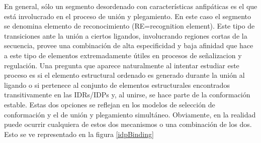 En general, sólo un segmento desordenado con características anfipáticas es el que está involucrado en el proceso de unión y plegamiento. En este caso el segmento se denomina elemento de reconocimiento (RE=recognition element). 
Este tipo de transiciones ante la unión a ciertos ligandos, involucrando regiones cortas de la secuencia, provee una combinación de alta especificidad y 
baja afinidad que hace a este tipo de elementos extremadamente útiles en procesos de señalizacion y regulación.
Una pregunta que aparece naturalmente al intentar estudiar este proceso es si el elemento estructural ordenado es generado durante la unión al ligando 
o si pertenece al conjunto de elementos estructurales encontrados transitivamente en las IDRs/IDPs y, al unirse, se hace parte de la conformación estable.
Estas dos opciones se reflejan en los modelos de selección de conformación y el de unión y plegamiento simultáneo.
Obviamente, en la realidad puede ocurrir cualquiera de estos dos mecanismos o una combinación de los dos.
Esto se ve representado en la figura \ref{idpBinding}


